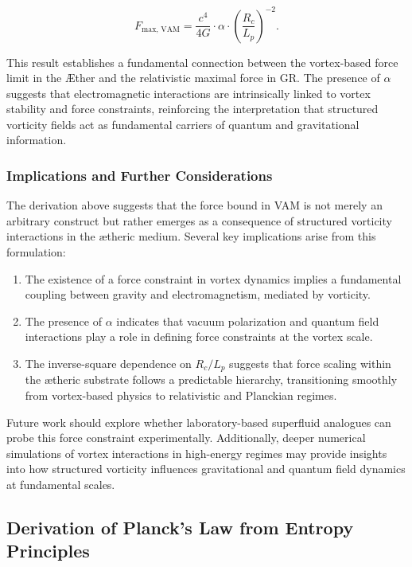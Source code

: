 \documentclass[a4paper,10pt]{article}
\begin{document}
\begin{equation*}
F_\text{max, VAM} = \frac{c^4}{4G} \cdot \alpha \cdot \left(\frac{R_c}{L_p}\right)^{-2}.
\end{equation*}


This result establishes a fundamental connection between the vortex-based force limit in the Æther and the relativistic maximal force in GR. The presence of $\alpha$ suggests that electromagnetic interactions are intrinsically linked to vortex stability and force constraints, reinforcing the interpretation that structured vorticity fields act as fundamental carriers of quantum and gravitational information.


\subsubsection*{Implications and Further Considerations}
The derivation above suggests that the force bound in VAM is not merely an arbitrary construct but rather emerges as a consequence of structured vorticity interactions in the ætheric medium. Several key implications arise from this formulation:
\begin{enumerate}
\item The existence of a force constraint in vortex dynamics implies a fundamental coupling between gravity and electromagnetism, mediated by vorticity.
\item The presence of $\alpha$ indicates that vacuum polarization and quantum field interactions play a role in defining force constraints at the vortex scale.
\item The inverse-square dependence on $R_c/L_p$ suggests that force scaling within the ætheric substrate follows a predictable hierarchy, transitioning smoothly from vortex-based physics to relativistic and Planckian regimes.
\end{enumerate}


Future work should explore whether laboratory-based superfluid analogues can probe this force constraint experimentally. Additionally, deeper numerical simulations of vortex interactions in high-energy regimes may provide insights into how structured vorticity influences gravitational and quantum field dynamics at fundamental scales.

    \subsection{Derivation of Planck's Law from Entropy Principles}
\end{document}
